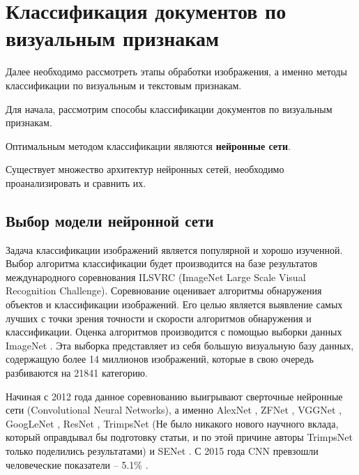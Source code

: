 \section{Классификация документов по визуальным признакам}

Далее необходимо рассмотреть этапы обработки изображения, а именно методы классификации по визуальным и текстовым признакам.

Для начала, рассмотрим способы классификации документов по визуальным признакам.

Оптимальным методом классификации являются \textbf{нейронные сети}. 

Существует множество архитектур нейронных сетей, необходимо проанализировать и сравнить их.

\subsection{Выбор модели нейронной сети}

Задача классификации изображений является популярной и хорошо изученной. Выбор алгоритма классификации будет производится на базе результатов международного соревнования ILSVRC \cite{ILSVRC} (ImageNet Large Scale Visual Recognition Challenge). Соревнование оценивает алгоритмы обнаружения объектов и классификации изображений. Его целью является выявление самых лучших с точки зрения точности и скорости алгоритмов обнаружения и классификации. Оценка алгоритмов производится с помощью выборки данных ImageNet \cite{imagenet}. Эта выборка представляет из себя большую визуальную базу данных, содержащую более 14 миллионов изображений, которые в свою очередь разбиваются на 21841 категорию.

Начиная с 2012 года данное соревнованию выигрывают сверточные нейронные сети (Convolutional Neural Networks), а именно AlexNet \cite{alexnet}, ZFNet \cite{zfnet}, VGGNet \cite{vggnet}, GoogLeNet \cite{googlenet}, ResNet \cite{resnet}, TrimpsNet (Не было никакого нового научного вклада, который оправдывал бы подготовку статьи, и по этой причине авторы TrimpsNet только поделились результатами) и SENet \cite{senet}. С 2015 года CNN превзошли человеческие показатели -- 5.1\% \cite{human}. 


